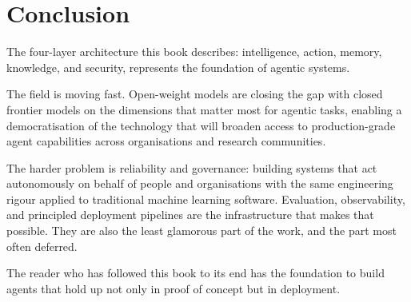 \chapter*{Conclusion}

The four-layer architecture this book describes: intelligence, action, memory,
knowledge, and security, represents the foundation of agentic systems.

The field is moving fast. Open-weight models are closing the gap with closed frontier
models on the dimensions that matter most for agentic tasks, enabling a democratisation
of the technology that will broaden access to production-grade agent capabilities across
organisations and research communities.

The harder problem is reliability and governance: building systems that act autonomously
on behalf of people and organisations with the same engineering rigour applied to
traditional machine learning software. Evaluation, observability, and principled
deployment pipelines are the infrastructure that makes that possible. They are also the
least glamorous part of the work, and the part most often deferred.

The reader who has followed this book to its end has the foundation to build agents that
hold up not only in proof of concept but in deployment.
